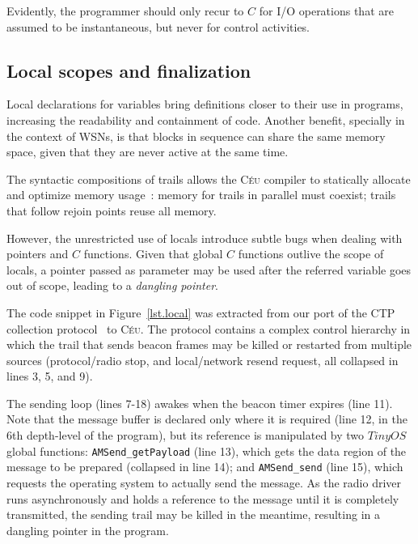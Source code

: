 \documentclass[10pt]{sensys-proc}
\newcommand{\CEU}{\textsc{C\'{e}u}\xspace}
\newcommand{\code}[1] {{\small{\texttt{#1}}}}
\begin{document}
\begin{comment}
This approach is also adopted by Esterel, which supports the \code{call} 
primitive to execute code assumed to be instantaneous in the host 
language~\cite{esterel.primer}.
In \CEU, we take a step further and statically detects when such calls may 
execute concurrently, as discussed in the next section.
\end{comment}

Evidently, the programmer should only recur to $C$ for I/O operations that are 
assumed to be instantaneous, but never for control activities.

\subsection{Local scopes and finalization}
\label{sec.ceu.local}

Local declarations for variables bring definitions closer to their use in 
programs, increasing the readability and containment of code.
Another benefit, specially in the context of WSNs, is that blocks in sequence 
can share the same memory space, given that they are never active at the same 
time.

The syntactic compositions of trails allows the \CEU compiler to statically 
allocate and optimize memory usage~\cite{wsn.osm}:
memory for trails in parallel must coexist;
trails that follow rejoin points reuse all memory.

However, the unrestricted use of locals introduce subtle bugs when dealing with 
pointers and $C$ functions.
Given that global $C$ functions outlive the scope of locals, a pointer passed 
as parameter may be used after the referred variable goes out of scope, leading 
to a \emph{dangling pointer}.

The code snippet in Figure~\ref{lst.local} was extracted from our port of the 
CTP collection protocol~\cite{wsn.teps} to \CEU.
The protocol contains a complex control hierarchy in which the trail that sends 
beacon frames may be killed or restarted from multiple sources (protocol/radio 
stop, and local/network resend request, all collapsed in lines 3, 5, and 9).

The sending loop (lines 7-18) awakes when the beacon timer expires (line 11).
Note that the message buffer is declared only where it is required (line 12, in 
the 6th depth-level of the program), but its reference is manipulated by two 
$TinyOS$ global functions:
\code{AMSend\_getPayload} (line 13), which gets the data region of the message 
to be prepared (collapsed in line 14);
and \code{AMSend\_send} (line 15), which requests the operating system to 
actually send the message.
As the radio driver runs asynchronously and holds a reference to the message 
until it is completely transmitted, the sending trail may be killed in the 
meantime, resulting in a dangling pointer in the program.
\end{document}
